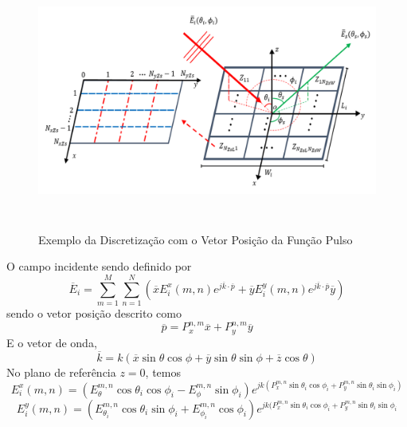 \documentclass[
	12pt,				%
	openright,			%
	oneside,			%
	a4paper,			%
	english,			%
	brazil				%
	]{abntex2}
\begin{document}
\begin{figure}[htb]
 \label{PulsosVetorPosicaoIlustracao}
 \centering
  \begin{minipage}{\textwidth}
    \centering
    \caption{Exemplo da Discretização com o Vetor Posição da Função Pulso} \label{fig_minipage_imagem2}
    \includegraphics[width=14cm, height=8.5cm]{figures/RISeixosplanar.png}
  \end{minipage}
  \hfill

\end{figure}
O campo incidente sendo definido por
\begin{equation}
\overline{E}_i=\sum_{m=1}^{M} \sum_{n=1}^{N} (\overline{x} E_{i}^{x}(m,n) e^{j\overline{k} \cdot  \overline{p}}+
\overline{y}E_{i}^{y}(m,n) e^{j\overline{k} \cdot  \overline{p}}\overline{y})
\end{equation}
sendo o vetor posição descrito como
\begin{equation}
 \overline{p}=P_x^{n,m}\overline{x}+P_y^{n,m}\overline{y}
\end{equation}
E o vetor de onda,
\begin{equation}
\overline{k}=k(\overline{x} \sin{\theta} \cos{\phi} + \overline{y}  \sin{\theta} \sin{\phi}+\overline{z}  \cos{\theta} )    
\end{equation}
No plano de referência $z=0$, temos
\begin{equation}
 E_{i}^{x}(m,n)=(E_{\theta}^{m,n} \cos{\theta_i} \cos{\phi_i} - E_{\phi}^{m,n} \sin{\phi_i} )
 e^{jk (P_x^{m,n}\sin{\theta_i} \cos{\phi_i} + P_y^{m,n} \sin{\theta_i} \sin{\phi_i} )}    
\end{equation}
\begin{equation}
E_{i}^{y}(m,n)=(E_{\theta_i}^{m,n} \cos{\theta_i} \sin{\phi_i} + E_{\phi_i}^{m,n} \cos{\phi_i} )
e^{jk(P_x^{m,n}\sin{\theta_i} \cos{\phi_i} + P_y^{m,n}\sin{\theta_i} \sin{\phi_i}} 
\end{equation}
\end{document}
